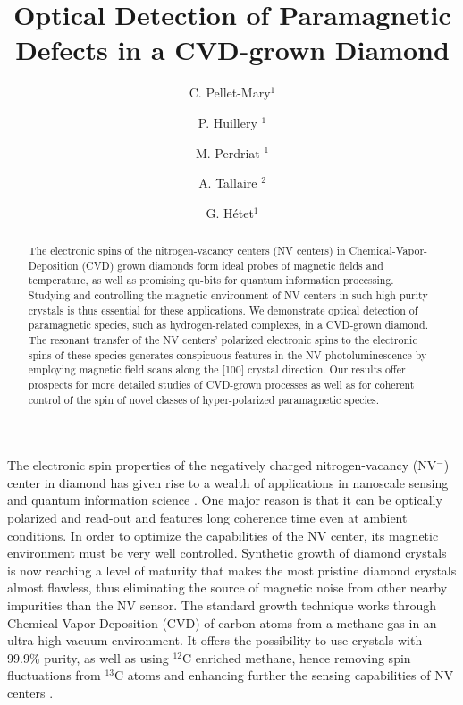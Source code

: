 \documentclass[9pt,twocolumn,twoside]{revtex4-1}
\begin{document}
\title{Optical Detection of Paramagnetic Defects in a CVD-grown Diamond}

\author{C. Pellet-Mary$^{1}$}
\author{P. Huillery $^{1}$}
\author{M. Perdriat $^{1}$}
\author{A. Tallaire $^{2}$}
\author{G. H\'etet$^{1}$} 



\begin{abstract}
The electronic spins of the nitrogen-vacancy centers (NV centers) in Chemical-Vapor-Deposition (CVD) grown diamonds form ideal probes of magnetic fields and temperature, as well as promising qu-bits for quantum information processing. 
Studying and controlling the magnetic environment of NV centers in such high purity crystals is thus essential for these applications.
We demonstrate optical detection of paramagnetic species, such as hydrogen-related complexes, in a CVD-grown diamond.
The resonant transfer of the NV centers' polarized electronic spins to the electronic spins of these species generates conspicuous features in the NV photoluminescence by employing magnetic field scans along the [100] crystal direction. 
Our results offer prospects for more detailed studies of CVD-grown processes as well as for coherent control of the spin of novel classes of hyper-polarized paramagnetic species.
\end{abstract}


\maketitle

The electronic spin properties of the negatively charged nitrogen-vacancy (NV$^-$) center in diamond has given rise to a wealth of applications in nanoscale sensing \cite{Rondin_2014} and quantum information science  \cite{DOHERTY20131}.
One major reason is that it can be optically polarized and read-out and features long coherence time even at ambient conditions. 
In order to optimize the capabilities of the NV center, its magnetic environment must be very well controlled. 
Synthetic growth of diamond crystals is now reaching a level of maturity that makes the most pristine diamond crystals almost flawless, thus eliminating the source of magnetic noise from other nearby impurities than the  NV sensor. The standard growth technique works through Chemical Vapor Deposition (CVD) of carbon atoms from a methane gas in an ultra-high vacuum environment. It offers the possibility to use crystals with 99.9\% purity, as well as using $^{12}$C enriched methane, hence removing spin fluctuations from $^{13}$C atoms and enhancing further the sensing capabilities of NV centers \cite{Achard}.
\end{document}
